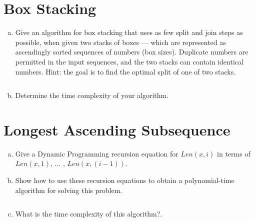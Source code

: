 \documentclass[12pt]{article}
\begin{document}
\section{Box Stacking}\label{box stacking}
\begin{enumerate}[(a)]
\item Give an algorithm for box stacking that uses as few split and join steps as possible, when given two stacks of boxes — which are represented as ascendingly sorted sequences of numbers (box sizes). Duplicate numbers are permitted in the input sequences, and the two stacks can contain identical numbers. Hint: the goal is to find the optimal split of one of two stacks.
\begin{addmargin}[2em]{2em}
\begin{lstlisting}

\end{lstlisting}
\end{addmargin}
\item Determine the time complexity of your algorithm.
\begin{addmargin}[4em]{2em}

\end{addmargin}
\end{enumerate}

\section{Longest Ascending Subsequence}\label{ascending subsequence}
\begin{enumerate}[(a)]
\item Give a Dynamic Programming recursion equation for $Len(x,i)$ in terms of $Len(x,1)$, ... , $Len(x,(i − 1))$.
\begin{addmargin}[2em]{2em}

\end{addmargin}
\item Show how to use these recursion equations to obtain a polynomial-time algorithm for solving this problem.
\begin{addmargin}[2em]{2em}

\begin{lstlisting}

\end{lstlisting}
\end{addmargin}
\item What is the time complexity of this algorithm?.
\begin{addmargin}[2em]{2em}

\end{addmargin}
\end{enumerate}
\end{document}
